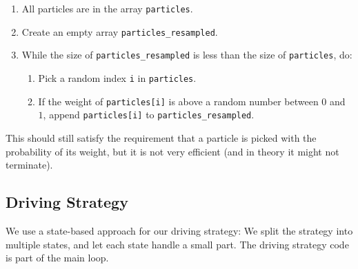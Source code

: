 \documentclass[a4paper,12pt]{article}
\begin{document}
\begin{enumerate}
\item All particles are in the array \texttt{particles}.
\item Create an empty array \texttt{particles_resampled}.
\item While the size of \texttt{particles_resampled} is less than the size of
\texttt{particles}, do:
\begin{enumerate}
\item Pick a random index \texttt{i} in \texttt{particles}.
\item If the weight of \texttt{particles[i]} is above a random number between
$0$ and $1$, append \texttt{particles[i]} to \texttt{particles_resampled}.
\end{enumerate}
\end{enumerate}

This should still satisfy the requirement that a particle is picked with the
probability of its weight, but it is not very efficient (and in theory it might
not terminate).


\subsection{Driving Strategy}

We use a state-based approach for our driving strategy: We split the strategy
into multiple states, and let each state handle a small part.  The driving
strategy code is part of the main loop.
\end{document}

